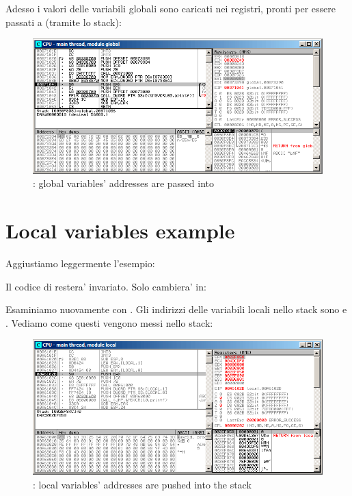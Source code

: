 \clearpage

Adesso i valori delle variabili globali sono caricati nei registri, pronti per essere passati a \printf (tramite lo stack):

\begin{figure}[H]
\centering
\includegraphics[scale=\FigScale]{patterns/061_pointers/olly_global4.png}
\caption{\olly: 
global variables' addresses are passed into \printf}
\label{fig:pointers_olly_global_4}
\end{figure}

\section{Local variables example}

Aggiustiamo leggermente l'esempio:



Il codice di \ttfone restera' invariato.
Solo \main cambiera' in:



\clearpage
Esaminiamo nuovamente con \olly.
Gli indirizzi delle variabili locali nello stack sono  e .
Vediamo come questi vengono messi nello stack: 

\begin{figure}[H]
\centering
\includegraphics[scale=\FigScale]{patterns/061_pointers/olly_stk1.png}
\caption{\olly: local variables' addresses are
pushed into the stack}
\label{fig:pointers_olly_stk_1}
\end{figure}

